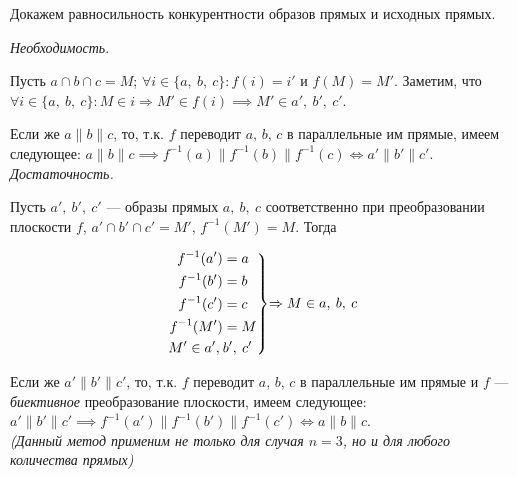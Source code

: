 \documentclass[14pt]{extarticle}
\theoremstyle{definition}
\theoremstyle{theorem}
\renewenvironment{rcases}
  {\left.\begin{aligned}}
  {\end{aligned}\right\rbrace}
\begin{document}
Докажем равносильность конкурентности образов прямых и исходных прямых.

\textit{Необходимость.}

Пусть $a \cap b \cap c = M$; $\forall i \in \{a, \: b, \: c\} \mathpunct{:} f(i) = i'$ 
и $f(M) = M'$. Заметим, что $\forall i \in \{a, \: b, \: c\} \mathpunct{:} M \in i 
\Rightarrow M' \in f(i) \implies M' \in a', \:  b', \: c'$. 

Если же $a \parallel b \parallel c$, то, т.к. $f$ переводит \(a, \, b, \, c\)
в параллельные им прямые, имеем следующее: \(a \parallel b \parallel c \implies
f^{-1}(a) \parallel f^{-1}(b) \parallel f^{-1}(c) \iff a' \parallel b' \parallel
c'\).\\


\textit{Достаточность.}

Пусть $a', \: b', \: c'$ --- образы прямых $a, \: b, \: c$ соответственно при
преобразовании плоскости $f$, $a' \cap b' \cap c' = M'$,
$f^{-1}(M') = M$. Тогда \\
\begin{ceqn}
\[
\begin{rcases}
	f^{-1}(a') &= a\\
	f^{-1}(b') &= b\\
	f^{-1}(c') &= c\\
	f^{-1}(M') &= M\\
	M' \in a', \: &b' , \: c' \\
\end{rcases}
\text{$\Rightarrow M \in a,\: b, \: c$}
\]
\end{ceqn}



Если же $a' \parallel b' \parallel c'$, то, т.к. $f$ переводит \(a, \, b, \, c\)
в параллельные им прямые и \(f\) --- \textit{биективное} преобразование плоскости, имеем
следующее: \(a' \parallel b' \parallel c' \implies
f^{-1}(a') \parallel f^{-1}(b') \parallel f^{-1}(c') \iff a \parallel b \parallel
c\).\\

\textit{(Данный метод применим не только для случая 
$n=3$, но и для любого количества прямых)} 
\end{document}
